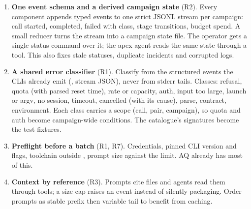 \documentclass[11pt,a4paper]{article}
\newcommand{\sig}[1]{\path{#1}}
\begin{document}
\begin{enumerate}[label=\textbf{D\arabic*}]
\item \textbf{One event schema and a derived campaign state} (R2). Every
  component appends typed events to one strict JSONL stream per campaign: call
  started, completed, failed with class, stage transitions, budget spend. A small
  reducer turns the stream into a campaign state file. The operator gets a single
  status command over it; the apex agent reads the same state through a tool. This
  also fixes stale statuses, duplicate incidents and corrupted logs.
\item \textbf{A shared error classifier} (R1). Classify from the structured events
  the CLIs already emit (\sig{turn.failed}, stream JSON), never from stderr tails.
  Classes: refusal, quota (with parsed reset time), rate or capacity, auth,
  input too large, launch or argv, no session, timeout, cancelled (with its cause),
  parse, contract, environment. Each class carries a scope (call, pair, campaign),
  so quota and auth become campaign-wide conditions. The catalogue's signatures
  become the test fixtures.
\item \textbf{Preflight before a batch} (R1, R7). Credentials, pinned CLI version
  and flags, toolchain outside , prompt size against the limit.
  AQ already has most of this.
\item \textbf{Context by reference} (R3). Prompts cite files and agents read them
  through tools; a size cap raises an event instead of silently packaging. Order
  prompts as stable prefix then variable tail to benefit from caching.


\end{enumerate}
\end{document}
